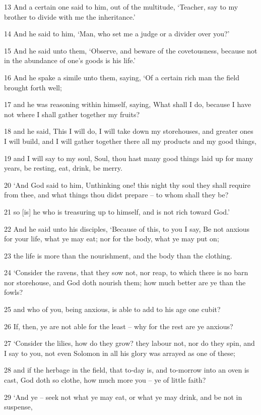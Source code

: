 \documentclass[11pt]{article}
\begin{document}
13 And a certain one said to him, out of the multitude, `Teacher, say to my brother to divide with me the inheritance.'

14 And he said to him, `Man, who set me a judge or a divider over you?'

15 And he said unto them, `Observe, and beware of the covetousness, because not in the abundance of one's goods is his life.'

16 And he spake a simile unto them, saying, `Of a certain rich man the field brought forth well;

17 and he was reasoning within himself, saying, What shall I do, because I have not where I shall gather together my fruits?

18 and he said, This I will do, I will take down my storehouses, and greater ones I will build, and I will gather together there all my products and my good things,

19 and I will say to my soul, Soul, thou hast many good things laid up for many years, be resting, eat, drink, be merry.

20 `And God said to him, Unthinking one! this night thy soul they shall require from thee, and what things thou didst prepare -- to whom shall they be?

21 so [is] he who is treasuring up to himself, and is not rich toward God.'

22 And he said unto his disciples, `Because of this, to you I say, Be not anxious for your life, what ye may eat; nor for the body, what ye may put on;

23 the life is more than the nourishment, and the body than the clothing.

24 `Consider the ravens, that they sow not, nor reap, to which there is no barn nor storehouse, and God doth nourish them; how much better are ye than the fowls?

25 and who of you, being anxious, is able to add to his age one cubit?

26 If, then, ye are not able for the least -- why for the rest are ye anxious?

27 `Consider the lilies, how do they grow? they labour not, nor do they spin, and I say to you, not even Solomon in all his glory was arrayed as one of these;

28 and if the herbage in the field, that to-day is, and to-morrow into an oven is cast, God doth so clothe, how much more you -- ye of little faith?

29 `And ye -- seek not what ye may eat, or what ye may drink, and be not in suspense,
\end{document}
